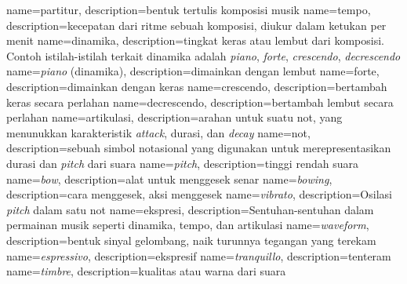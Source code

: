 {
    name=partitur,
    description={bentuk tertulis komposisi musik}
}
{
    name=tempo,
    description={kecepatan dari ritme sebuah komposisi, diukur dalam ketukan per menit}
}
{
	name=dinamika,
	description={tingkat keras atau lembut dari komposisi. Contoh istilah-istilah terkait dinamika adalah \textit{piano}, \textit{forte}, \textit{crescendo}, \textit{decrescendo}}
}
{
	name={\textit{piano} (dinamika)},
	description={dimainkan dengan lembut}
}
{
	name={forte},
	description={dimainkan dengan keras}
}
{
	name=crescendo,
	description={bertambah keras secara perlahan}
}
{
	name=decrescendo,
	description={bertambah lembut secara perlahan}
}
{
	name=artikulasi,
	description={arahan untuk suatu not, yang menunukkan karakteristik \textit{attack}, durasi, dan \textit{decay}}
}
{
	name=not,
	description={sebuah simbol notasional yang digunakan untuk merepresentasikan durasi dan \textit{pitch} dari suara}
}
{
	name=\textit{pitch},
	description={tinggi rendah suara}
}
{
	name=\textit{bow},
	description={alat untuk menggesek senar}
}
{
	name=\textit{bowing},
	description={cara menggesek, aksi menggesek}
}
{
	name=\textit{vibrato},
	description={Osilasi \textit{pitch} dalam satu not}
}
{
	name=ekspresi,
	description={Sentuhan-sentuhan dalam permainan musik seperti dinamika, tempo, dan artikulasi}
}
{
	name=\textit{waveform},
	description={bentuk sinyal gelombang, naik turunnya tegangan yang terekam}
}
{
	name=\textit{espressivo},
	description={ekspresif}
}
{
	name=\textit{tranquillo},
	description={tenteram}
}
{
	name=\textit{timbre},
	description={kualitas atau warna dari suara}
}